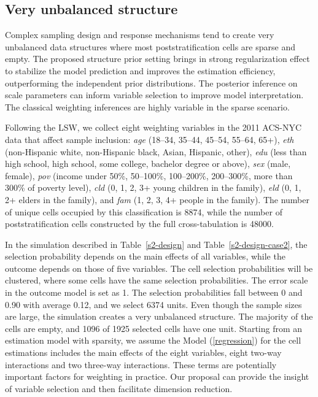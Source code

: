 \documentclass[11pt]{article}
\begin{document}
\subsection{Very unbalanced structure}
\label{8var}

Complex sampling design and response mechanisms tend to create very unbalanced data structures where most poststratification cells are sparse and empty. The proposed structure prior setting brings in strong regularization effect to stabilize the model prediction and improves the estimation efficiency, outperforming the independent prior distributions. The posterior inference on scale parameters can inform variable selection to improve model interpretation. The classical weighting inferences are highly variable in the sparse scenario. 

Following the LSW, we collect eight weighting variables in the 2011 ACS-NYC data that affect sample inclusion: {\em age} (18--34, 35--44, 45--54, 55--64, 65+), {\em eth} (non-Hispanic white, non-Hispanic black, Asian, Hispanic, other), {\em edu} (less than high school, high school, some college, bachelor degree or above), {\em sex} (male, female), {\em pov} (income under 50\%, 50--100\%, 100--200\%, 200--300\%, more than 300\% of poverty level), {\em cld} (0, 1, 2, 3+ young children in the family), {\em eld} (0, 1, 2+ elders in the family), and {\em fam} (1, 2, 3, 4+ people in the family). The number of unique cells occupied by this classification is 8874, while the number of poststratification cells constructed by the full cross-tabulation is 48000. 

In the simulation described in Table~\ref{s2-design} and Table~\ref{s2-design-case2}, the selection probability depends on the main effects of all variables, while the outcome depends on those of five variables. The cell selection probabilities will be clustered, where some cells have the same selection probabilities. The error scale in the outcome model is set as 1. The selection probabilities fall between 0 and 0.90 with average 0.12, and we select 6374 units. Even though the sample sizes are large, the simulation creates a very unbalanced structure. The majority of the cells are empty, and 1096 of 1925 selected cells have one unit. Starting from an estimation model with sparsity, we assume the Model (\ref{regression}) for the cell estimations includes the main effects of the eight variables, eight two-way interactions and two three-way interactions. These terms are potentially important factors for weighting in practice. Our proposal can provide the insight of variable selection and then facilitate dimension reduction. 
\end{document}
